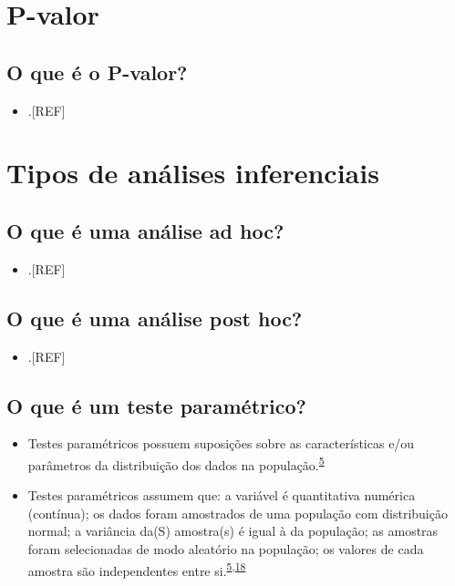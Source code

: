 \documentclass[
]{book}
\providecommand{\tightlist}{%
  \setlength{\itemsep}{0pt}\setlength{\parskip}{0pt}}
\begin{document}
\hypertarget{p-valor}{%
\section{P-valor}\label{p-valor}}

\hypertarget{o-que-uxe9-o-p-valor}{%
\subsection{O que é o P-valor?}\label{o-que-uxe9-o-p-valor}}

\begin{itemize}
\tightlist
\item
  .{[}REF{]}
\end{itemize}

\hypertarget{tipos-analises-inferenciais}{%
\section{Tipos de análises inferenciais}\label{tipos-analises-inferenciais}}

\hypertarget{o-que-uxe9-uma-anuxe1lise-ad-hoc}{%
\subsection{O que é uma análise ad hoc?}\label{o-que-uxe9-uma-anuxe1lise-ad-hoc}}

\begin{itemize}
\tightlist
\item
  .{[}REF{]}
\end{itemize}

\hypertarget{o-que-uxe9-uma-anuxe1lise-post-hoc}{%
\subsection{O que é uma análise post hoc?}\label{o-que-uxe9-uma-anuxe1lise-post-hoc}}

\begin{itemize}
\tightlist
\item
  .{[}REF{]}
\end{itemize}

\hypertarget{o-que-uxe9-um-teste-paramuxe9trico}{%
\subsection{O que é um teste paramétrico?}\label{o-que-uxe9-um-teste-paramuxe9trico}}

\begin{itemize}
\item
  Testes paramétricos possuem suposições sobre as características e/ou parâmetros da distribuição dos dados na população.\textsuperscript{\protect\hyperlink{ref-vetter2017}{5}}
\item
  Testes paramétricos assumem que: a variável é quantitativa numérica (contínua); os dados foram amostrados de uma população com distribuição normal; a variância da(S) amostra(s) é igual à da população; as amostras foram selecionadas de modo aleatório na população; os valores de cada amostra são independentes entre si.\textsuperscript{\protect\hyperlink{ref-vetter2017}{5},\protect\hyperlink{ref-Ali2016}{18}}
\end{itemize}
\end{document}

